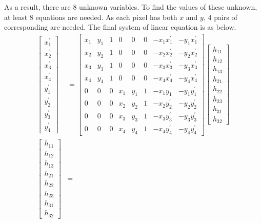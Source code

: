 \documentclass[11pt]{article}
\begin{document}
As a result, there are 8 unknown variables. To find the values of these unknown, at least 8 equations are needed. As each pixel has both $x$ and $y$, 4 pairs of corresponding are needed. The final system of linear equation is as below.
\begin{align*}
\begin{bmatrix}
x_1^{'}\\ x_2^{'}\\ x_3^{'} \\ x_4^{'} \\ y_1^{'} \\ y_2^{'} \\ y_3^{'} \\ y_4^{'}
\end{bmatrix} &=
\begin{bmatrix}
x_{1} & y_{1} & 1  & 0 & 0 & 0 & -x_{1}x_1^{'} & -y_{1}x_1^{'}\\ 
x_{2} & y_{2} & 1  & 0 & 0 & 0 & -x_{2}x_2^{'} & -y_{2}x_2^{'}\\ 
x_{3} & y_{3} & 1  & 0 & 0 & 0 & -x_{3}x_3^{'} & -y_{3}x_3^{'}\\ 
x_{4} & y_{4} & 1  & 0 & 0 & 0 & -x_{4}x_4^{'} & -y_{4}x_4^{'}\\ 
0 & 0 & 0 & x_{1} & y_{1} & 1 & -x_{1}y_1^{'} & -y_{1}y_1^{'}\\ 
0 & 0 & 0 & x_{2} & y_{2} & 1 & -x_{2}y_2^{'} & -y_{2}y_2^{'}\\ 
0 & 0 & 0 & x_{3} & y_{3} & 1 & -x_{3}y_3^{'} & -y_{3}y_3^{'}\\ 
0 & 0 & 0 & x_{4} & y_{4} & 1 & -x_{4}y_4^{'} & -y_{4}y_4^{'}
\end{bmatrix}
\begin{bmatrix}
h_{11} \\ h_{12}\\ h_{13} \\ h_{21} \\ h_{22} \\ h_{23} \\ h_{31} \\ h_{32}
\end{bmatrix} \\
\begin{bmatrix}
h_{11} \\ h_{12}\\ h_{13} \\ h_{21} \\ h_{22} \\ h_{23} \\ h_{31} \\ h_{32}
\end{bmatrix} &=

\end{align*}
\end{document}
